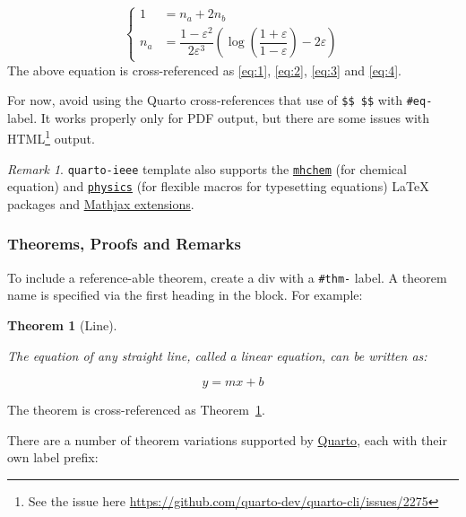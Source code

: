\documentclass[
  journal,
]{IEEEtran}%
\theoremstyle{plain}
\newtheorem{theorem}{Theorem}[section]
\theoremstyle{remark}
\newtheorem*{remark}{Remark}
\begin{document}
\begin{equation}\label{eq:4}
\begin{cases}
    1&=n_a+2n_b \\
    n_a&=\dfrac{1-{\varepsilon}^2}{2{\varepsilon}^3}\left(\log\left(\dfrac{1+{\varepsilon}}{1-{\varepsilon}}\right)-2{\varepsilon}\right)
\end{cases}
\end{equation} The above equation is cross-referenced as \eqref{eq:1},
\eqref{eq:2}, \eqref{eq:3} and \eqref{eq:4}.

For now, avoid using the Quarto cross-references that use of
\texttt{\$\$\ \$\$} with \texttt{\#eq-} label. It works properly only
for PDF output, but there are some issues with HTML\footnote{See the
  issue here \url{https://github.com/quarto-dev/quarto-cli/issues/2275}}
output.

\begin{remark}
\texttt{quarto-ieee} template also supports the
\href{https://ctan.org/pkg/mhchem}{\texttt{mhchem}} (for chemical
equation) and \href{https://ctan.org/pkg/physics}{\texttt{physics}} (for
flexible macros for typesetting equations) {\LaTeX} packages and
\href{https://docs.mathjax.org/en/latest/input/tex/extensions/index.html}{Mathjax
extensions}.
\end{remark}

\subsubsection{Theorems, Proofs and
Remarks}\label{theorems-proofs-and-remarks}

To include a reference-able theorem, create a div with a \texttt{\#thm-}
label. A theorem name is specified via the first heading in the block.
For example:

\begin{theorem}[Line]\protect\hypertarget{thm-line}{}\label{thm-line}

The equation of any straight line, called a linear equation, can be
written as:

\[
y = mx + b
\]

\end{theorem}

The theorem is cross-referenced as Theorem~\ref{thm-line}.

There are a number of theorem variations supported by
\href{https://quarto.org/docs/authoring/cross-references.html\#theorems-and-proofs}{Quarto},
each with their own label prefix:
\end{document}
